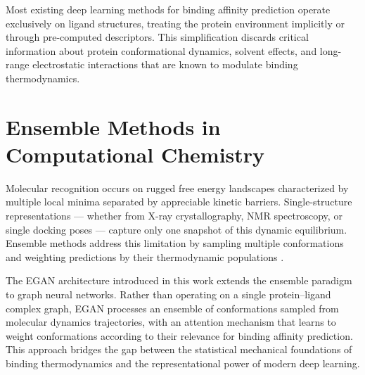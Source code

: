 \documentclass[12pt,oneside]{report}
\begin{document}
\begin{insightbox}
Most existing deep learning methods for binding affinity prediction operate exclusively on ligand structures, treating the protein environment implicitly or through pre-computed descriptors. This simplification discards critical information about protein conformational dynamics, solvent effects, and long-range electrostatic interactions that are known to modulate binding thermodynamics.
\end{insightbox}

\section{Ensemble Methods in Computational Chemistry}

Molecular recognition occurs on rugged free energy landscapes characterized by multiple local minima separated by appreciable kinetic barriers. Single-structure representations --- whether from X-ray crystallography, NMR spectroscopy, or single docking poses --- capture only one snapshot of this dynamic equilibrium. Ensemble methods address this limitation by sampling multiple conformations and weighting predictions by their thermodynamic populations \cite{Amaro2018}.

The EGAN architecture introduced in this work extends the ensemble paradigm to graph neural networks. Rather than operating on a single protein--ligand complex graph, EGAN processes an ensemble of conformations sampled from molecular dynamics trajectories, with an attention mechanism that learns to weight conformations according to their relevance for binding affinity prediction. This approach bridges the gap between the statistical mechanical foundations of binding thermodynamics and the representational power of modern deep learning.
\end{document}

